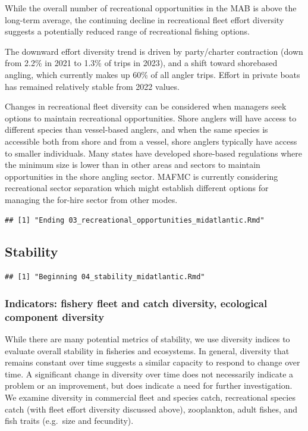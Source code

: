 \documentclass[
  10pt,
]{article}
\begin{document}
While the overall number of recreational opportunities in the MAB is above the long-term average, the continuing decline in recreational fleet effort diversity suggests a potentially reduced range of recreational fishing options.

The downward effort diversity trend is driven by party/charter contraction (down from 2.2\% in 2021 to 1.3\% of trips in 2023), and a shift toward shorebased angling, which currently makes up 60\% of all angler trips. Effort in private boats has remained relatively stable from 2022 values.

Changes in recreational fleet diversity can be considered when managers seek options to maintain recreational opportunities. Shore anglers will have access to different species than vessel-based anglers, and when the same species is accessible both from shore and from a vessel, shore anglers typically have access to smaller individuals. Many states have developed shore-based regulations where the minimum size is lower than in other areas and sectors to maintain opportunities in the shore angling sector. MAFMC is currently considering recreational sector separation which might establish different options for managing the for-hire sector from other modes.

\begin{verbatim}
## [1] "Ending 03_recreational_opportunities_midatlantic.Rmd"
\end{verbatim}

\subsection{Stability}\label{stability}

\begin{verbatim}
## [1] "Beginning 04_stability_midatlantic.Rmd"
\end{verbatim}

\subsubsection{Indicators: fishery fleet and catch diversity, ecological component diversity}\label{indicators-fishery-fleet-and-catch-diversity-ecological-component-diversity}

While there are many potential metrics of stability, we use diversity indices to evaluate overall stability in fisheries and ecosystems. In general, diversity that remains constant over time suggests a similar capacity to respond to change over time. A significant change in diversity over time does not necessarily indicate a problem or an improvement, but does indicate a need for further investigation. We examine diversity in commercial fleet and species catch, recreational species catch (with fleet effort diversity discussed above), zooplankton, adult fishes, and fish traits (e.g.~size and fecundity).
\end{document}

